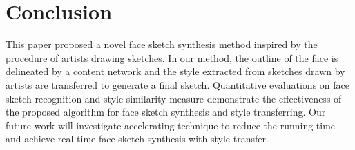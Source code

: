 \documentclass[10pt,twocolumn,letterpaper]{article}
\begin{document}
\section{Conclusion}

This paper proposed a novel face sketch synthesis method inspired by the procedure of artists drawing sketches. In our method, the outline of the face is delineated by a content network and the style extracted from sketches drawn by artists are transferred to generate a final sketch. Quantitative evaluations on face sketch recognition and style similarity measure demonstrate the effectiveness of the proposed algorithm for face sketch synthesis and style transferring. Our future work will investigate accelerating technique to reduce the running time and achieve real time face sketch synthesis with style transfer.


{\small


}
\end{document}
